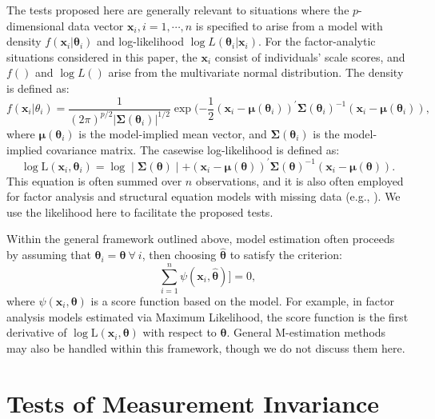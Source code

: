 \documentclass[man]{apa}
\begin{document}
The tests proposed here are generally relevant to situations where the
$p$-dimensional 
data vector $\bm{x}_i, i=1,\cdots,n$ is specified to arise from a model with
density $f(\bm{x}_i | \bm{\theta}_i)$ and log-likelihood 
$\log L(\bm{\theta}_i | \bm{x}_i)$.  
For the factor-analytic situations
considered in this paper, the $\bm{x}_i$ consist of individuals' scale
scores, and 
$f()$ and $\log L()$ arise from the multivariate normal distribution.
The density is defined as:
\begin{equation}
    \label{eq:mvndensity}
    f(\bm{x}_i | \theta_i) = \frac{1}{(2\pi)^{p/2} |
      \bm{\Sigma}(\bm{\theta}_i) |^{1/2}}\exp(-\frac{1}{2}(\bm{x}_i -
    \bm{\mu}(\bm{\theta}_i))^{\prime} \bm{\Sigma}(\bm{\theta}_i)^{-1} (\bm{x}_i -
    \bm{\mu}(\bm{\theta}_i)),
\end{equation}
where ${\bm{\mu}}({\bm{\theta}}_i)$ is the
model-implied mean vector, and ${\bm{\Sigma}}({\bm{\theta}}_i)$ is the
model-implied covariance matrix.
The casewise log-likelihood is defined as:
\begin{equation}
    \label{eq:caselik}
    \log \text{L}({\bm{x}}_i, {\bm{\theta}}_i) = %
\log \mid 
\bm{\Sigma}(\bm{\theta}) \mid + %
(\bm{x}_i -
\bm{\mu}(\bm{\theta}))^{\prime} \bm{\Sigma}(\bm{\theta})^{-1} (\bm{x}_i -
\bm{\mu}(\bm{\theta})).
\end{equation}
This equation is often summed over $n$ observations, and it is also
often employed for factor analysis and structural
equation models with missing data (e.g., ).  We use
the likelihood here to facilitate the proposed tests.

Within the general framework outlined above, model estimation
often proceeds by assuming that $\bm{\theta}_i = \bm{\theta}\
\forall\ i$, then choosing $\hat{\bm{\theta}}$ to satisfy the
criterion:
\begin{equation}
    \label{eq:score}
  \sum_{i=1}^{n} \psi(\bm{x}_i, \hat{\bm{\theta}})] = 0,    
\end{equation}
 where $\psi(\bm{x}_i, \bm{\theta})$ 
is a score function based on the model.  
For example, in factor analysis models estimated via Maximum
Likelihood, the score function is the first derivative of $\log
\text{L}(\bm{x}_i, \bm{\theta})$ with respect to $\bm{\theta}$.
General M-estimation methods may also be handled within this
framework, though we do not discuss them here.

\section{Tests of Measurement Invariance}
\end{document}

